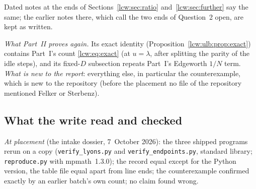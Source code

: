 \documentclass[11pt,letterpaper]{article}
\theoremstyle{remark}\newtheorem{remark}[theorem]{Remark}
\newcommand{\file}[1]{\nolinkurl{#1}}
\begin{document}
Dated notes at the ends of Sections~\ref{lcw:sec:ratio}
and~\ref{lcw:sec:further} say the same; the earlier notes there, which call
the two ends of Question~2 open, are kept as written.

\emph{What Part~II proves again.} Its exact identity
(Proposition~\ref{lcw:ulb:prop:exact}) contains Part~I's count
\eqref{lcw:eq:exact} (at $u=\lambda$, after splitting the parity of the idle
steps), and its fixed-$D$ subsection repeats Part~I's Edgeworth $1/N$ term.
\emph{What is new to the report}: everything else, in particular the
counterexample, which is new to the repository (before the placement no
file of the repository mentioned Felker or Sterbenz).

\subsection{What the write read and checked}\label{lcw:ulb:sec:checks}

\emph{At placement} (the intake dossier, 7~October 2026): the three shipped
programs rerun on a copy (\file{verify\_lyons.py} and
\file{verify\_endpoints.py}, standard library; \file{reproduce.py} with
mpmath~1.3.0); the record equal except for the Python version, the table
file equal apart from line ends; the counterexample confirmed exactly by an
earlier batch's own count; no claim found wrong.
\end{document}
